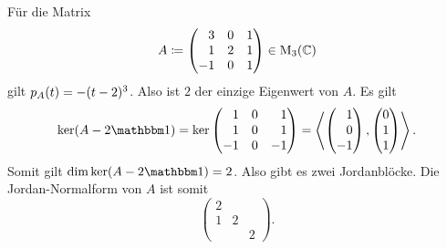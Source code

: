 \begin{example}
  Für die Matrix
  \[
              A
    \coloneqq \begin{pmatrix*}[r]
                 3  & 0 & 1 \\
                 1  & 2 & 1 \\
                -1  & 0 & 1
              \end{pmatrix*}
    \in \matrices{3}{\Complex}
  \]
  gilt $p_{A}(t) = -(t-2)^3$.
  Also ist $2$ der einzige Eigenwert von $A$.
  Es gilt
  \[
      \ker (A - 2\Id)
    = \ker
      \begin{pmatrix*}[r]
         1  & 0 &  1  \\
         1  & 0 &  1  \\
        -1  & 0 & -1
      \end{pmatrix*}
    = \generated{ \rvect{1 \\ 0 \\ -1}, \vect{0 \\ 1 \\ 1} }.
  \]
  Somit gilt $\dim \ker (A - 2\Id) = 2$.
  Also gibt es zwei Jordanblöcke.
  Die Jordan-Normalform von $A$ ist somit
  \[
    \begin{pmatrix}
      2 &   &   \\
      1 & 2 &   \\
        &   & 2
    \end{pmatrix}.
  \]
\end{example}

